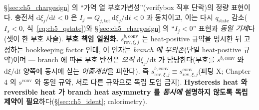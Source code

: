 \documentclass[11pt,a4paper]{article}
\newcommand{\dd}{\mathrm{d}}
\newcommand{\tot}{\mathrm{tot}}
\newcommand{\rev}{\mathrm{rev}}
\newcommand{\conv}{\mathrm{conv}}
\newcommand{\stt}{\mathrm{state}}
\begin{document}
\S\ref{sec:ch5_chargesign} 의 ``가역 열 부호가변성''(verifybox 직후 단락)의 정량 표현이다. 충전서 $\dd\xi_j/\dd t<0$
은 $I_j=Q_{j,\tot}\,\dd\xi_j/\dd t<0$ 과 동치이고, 이는 다시 $q_\stt$ 감소($I_s<0$, 식~\eqref{eq:ch5_qstate})와
\S\ref{sec:ch5_chargesign} 의 ``$I_j<0$'' 표현과 \emph{동일 기제}다(셋이 한 부호 사슬). \textbf{부호 책임 일원화.}
$s_{\rev,\xi,j}^{b,\conv}$ 는 heat-positive 규약을 명시한 뒤 고정하는 bookkeeping factor 인데, 이 인자는
\emph{branch 에 무의존}(단일 heat-positive 규약)이며 — branch 에 따른 부호 반전은 \emph{오직} $\dd\xi_j/\dd t$ 가
담당한다(부호를 $s^{b,\conv}$ 와 $\dd\xi/\dd t$ 양쪽에 동시에 싣는 \emph{이중계상}을 피한다). 즉
$s_{\rev,\xi,j}^{b,\conv}\equiv s_{\rev,\xi,j}^{\conv}$(피팅 X; Chapter 4 의 $s^\conv$ 와 동일 규약, 서로 다른
규약으로 독립 도입 금지). \textbf{Hysteresis heat 와 reversible heat 가 branch heat asymmetry 를
\emph{동시에} 설명하지 않도록 독립 제약이 필요}하다(\S\ref{sec:ch5_ident}; calorimetry).

\end{document}
